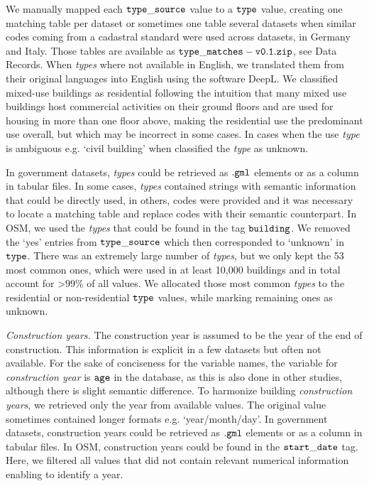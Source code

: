 \documentclass[fleqn,10pt]{wlscirep}
\begin{document}
We manually mapped each $\tt{type\_source}$ value to a $\tt{type}$ value, creating one matching table per dataset or sometimes one table several datasets when similar codes coming from a cadastral standard were used across datasets, in Germany and Italy. Those tables are available as ${\tt type\_matches-v0.1.zip}$, see Data Records. When \textit{types} where not available in English, we translated them from their original languages into English using the software DeepL. We classified mixed-use buildings as residential following the intuition that many mixed use buildings host commercial activities on their ground floors and are used for housing in more than one floor above, making the residential use the predominant use overall, but which may be incorrect in some cases. In cases when the use \textit{type} is ambiguous e.g. `civil building' when classified the \textit{type} as unknown.

In government datasets, \textit{types} could be retrieved as $\tt{.gml}$ elements or as a column in tabular files. In some cases, \textit{types} contained strings with semantic information that could be directly used, in others, codes were provided and it was necessary to locate a matching table and replace codes with their semantic counterpart. In OSM, we used the \textit{types} that could be found in the tag $\tt{building}$. We removed the `yes' entries from $\tt{type\_source}$ which then corresponded to `unknown' in $\tt{type}$. There was an extremely large number of \textit{types}, but we only kept the 53 most common ones, which were used in at least 10,000 buildings and in total account for >99\% of all values. We allocated those most common \textit{types} to the residential or non-residential $\tt{type}$ values, while marking remaining ones as unknown.

\medskip \noindent \textit{Construction years.} \hspace{0.1cm} The construction year is assumed to be the year of the end of construction. This information is explicit in a few datasets but often not available. For the sake of conciseness for the variable names, the variable for \textit{construction year} is $\tt{age}$ in the database, as this is also done in other studies\cite{rosser2019predicting}, although there is slight semantic difference. To harmonize building \textit{construction years}, we retrieved only the year from available values. The original value sometimes contained longer formats e.g. `year/month/day'. In government datasets, construction years could be retrieved as $\tt{.gml}$ elements or as a column in tabular files. In OSM, construction years could be found in the $\tt{start\_date}$ tag. Here, we filtered all values that did not contain relevant numerical information enabling to identify a year.
\end{document}
